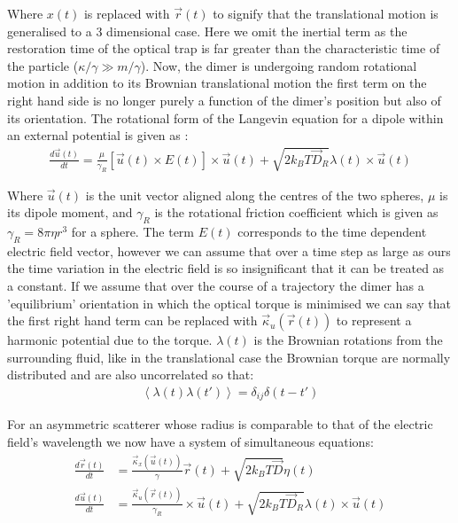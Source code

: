 Where $x(t)$ is replaced with $\vec{r}(t)$ to signify that the translational 
motion is generalised to a 3 dimensional case. Here we omit the inertial term 
as the restoration time of the optical trap is far greater than the characteristic time of the particle ($\kappa/\gamma \gg m/\gamma$). Now, the dimer is undergoing random rotational motion in addition to its Brownian 
translational motion the first term on the right hand side is no longer 
purely a function of the dimer's position but also of its orientation. 
The rotational form of the Langevin equation for a dipole within an external 
potential is given as \cite{Mazo2008}:
\begin{align}
	\frac{{d}\vec{u}(t)}{{dt}}
	=
	\frac{\mu}{\gamma_R}\left[\vec{u}(t)\times E(t)\right]\times \vec{u}(t)
	+ \sqrt{2k_BT\vec{D}_R}\lambda(t)\times \vec{u}(t)
\end{align}

Where $\vec{u}(t)$ is the unit vector aligned along the centres of 
the two spheres, $\mu$ is its dipole moment, and $\gamma_R$ is the 
rotational friction coefficient which is given as $\gamma_R = 8\pi
\eta r^3$ for a sphere. The term $E(t)$ corresponds to the time 
dependent electric field vector, however we can assume that over a
time step as large as ours the time variation in the electric field 
is so insignificant that it can be treated as a constant. If we assume 
that over the course of a trajectory the dimer has a 'equilibrium' orientation in which the optical torque is minimised we can say that 
the first right hand term can be replaced with $\vec{\kappa}_u(\vec{r}
(t))$ to represent a harmonic potential due to the torque. $\lambda(t)$ 
is the Brownian rotations from the surrounding fluid, like in the translational case the Brownian torque are normally distributed and are 
also uncorrelated so that:
\begin{align}
	\left<\lambda(t)\lambda(t')\right> = \delta_{ij}\delta(t-t')
\end{align}

For an asymmetric scatterer whose radius is comparable to that of the 
electric field's wavelength we now have a system of simultaneous equations:
\begin{align}
	\label{eq:full_langevin}
	\frac{{d}\vec{r}(t)}{{dt}}
	&=
	\frac{\vec{\kappa}_x(\vec{u}(t))}{\gamma}\vec{r}(t) + \sqrt{2k_BT\vec{D}}\eta(t)
	\\
	\frac{{d}\vec{u}(t)}{{dt}}
	&=
	\frac{\vec{\kappa}_u(\vec{r}(t))}{\gamma_R}\times \vec{u}(t)
	+ \sqrt{2k_BT\vec{D}_R}\lambda(t)\times \vec{u}(t)
\end{align}

